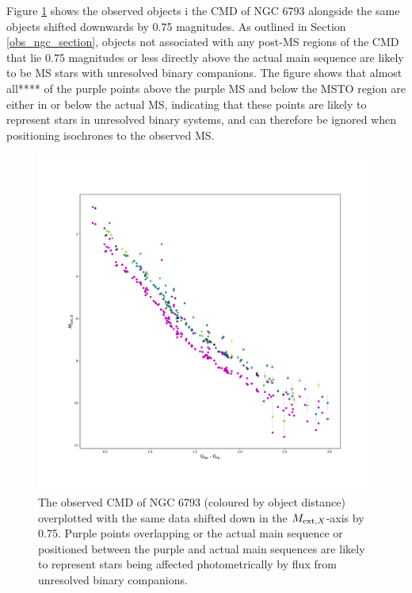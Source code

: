 \documentclass[12pt, a4paper]{report}
\begin{document}
Figure \ref{NGC_6793_binary} shows the observed objects i  the CMD of NGC 6793 alongside the same objects shifted downwards by 0.75 magnitudes. As outlined in Section \ref{obs_ngc_section}, objects not associated with any post-MS regions of the CMD that lie 0.75 magnitudes or less directly above the actual main sequence are likely to be MS stars with unresolved binary companions. The figure shows that almost all**** of the purple points above the purple MS and below the MSTO region are either in or below the actual MS, indicating that these points are likely to represent stars in unresolved binary systems, and can therefore be ignored when positioning isochrones to the observed MS.

\begin{figure}[h!]
\begin{center}
\includegraphics[width=1.0\textwidth]{../NGC_6793_CMD_FeH_0p062_Av_500Myr_binary_check.pdf}
\caption{The observed CMD of NGC 6793 (coloured by object distance) overplotted with the same data shifted down in the $M_{\textnormal{ext},X}$-axis by 0.75. Purple points overlapping or the actual main sequence or positioned between the purple and actual main sequences are likely to represent stars being affected photometrically by flux from unresolved binary companions.}
\label{NGC_6793_binary}
\end{center}
\end{figure}
\end{document}
